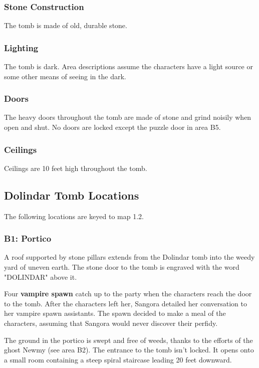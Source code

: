 \documentclass[10pt,a4paper,twoside,bg=print,twocolumn,openany,nodeprecatedcode]{dndbook}
\begin{document}
\subsubsection{Stone Construction}
The tomb is made of old, durable stone.

\subsubsection{Lighting}
The tomb is dark. Area descriptions assume the characters have a light source or some other means of seeing in the dark.

\subsubsection{Doors}
The heavy doors throughout the tomb are made of stone and grind noisily when open and shut. No doors are locked except the puzzle door in area B5.

\subsubsection{Ceilings}
Ceilings are 10 feet high throughout the tomb.

\subsection{Dolindar Tomb Locations}
The following locations are keyed to map 1.2.

\subsubsection{B1: Portico}
\begin{DndReadAloud}{}
A roof supported by stone pillars extends from the Dolindar tomb into the weedy yard of uneven earth. The stone door to the tomb is engraved with the word "DOLINDAR" above it.

\end{DndReadAloud}

Four \textbf{vampire spawn} catch up to the party when the characters reach the door to the tomb. After the characters left her, Sangora detailed her conversation to her vampire spawn assistants. The spawn decided to make a meal of the characters, assuming that Sangora would never discover their perfidy.

The ground in the portico is swept and free of weeds, thanks to the efforts of the ghost Newmy (see area B2). The entrance to the tomb isn't locked. It opens onto a small room containing a steep spiral staircase leading 20 feet downward.
\end{document}
